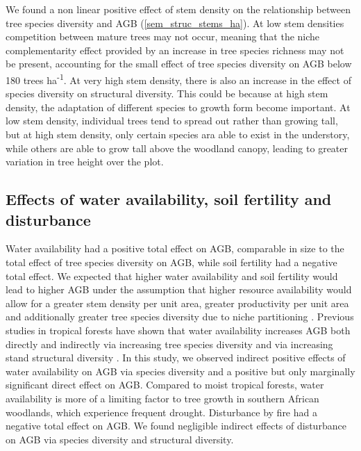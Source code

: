 \documentclass[11pt,a4paper]{article}
\newcommand{\textapprox}{\raisebox{0.5ex}{\texttildelow}}  %
\begin{document}
We found a non linear positive effect of stem density on the relationship between tree species diversity and AGB (\autoref{sem_struc_stems_ha}). At low stem densities competition between mature trees may not occur, meaning that the niche complementarity effect provided by an increase in tree species richness may not be present, accounting for the small effect of tree species diversity on AGB below \textapprox{}180 trees ha\textsuperscript{-1}. At very high stem density, there is also an increase in the effect of species diversity on structural diversity. This could be because at high stem density, the adaptation of different species to growth form become important. At low stem density, individual trees tend to spread out rather than growing tall, but at high stem density, only certain species ara able to exist in the understory, while others are able to grow tall above the woodland canopy, leading to greater variation in tree height over the plot.

\subsection{Effects of water availability, soil fertility and disturbance}

Water availability had a positive total effect on AGB, comparable in size to the total effect of tree species diversity on AGB, while soil fertility had a negative total effect. We expected that higher water availability and soil fertility would lead to higher AGB under the assumption that higher resource availability would allow for a greater stem density per unit area, greater productivity per unit area and additionally greater tree species diversity due to niche partitioning \citep{Kraaij2006, Shirima2015}. Previous studies in tropical forests have shown that water availability increases AGB both directly and indirectly via increasing tree species diversity and via increasing stand structural diversity \citep{Ali2019a, Ali2019b, Poorter2017}. In this study, we observed indirect positive effects of water availability on AGB via species diversity and a positive but only marginally significant direct effect on AGB. Compared to moist tropical forests, water availability is more of a limiting factor to tree growth in southern African woodlands, which experience frequent drought. Disturbance by fire had a negative total effect on AGB. We found negligible indirect effects of disturbance on AGB via species diversity and structural diversity. 
\end{document}
